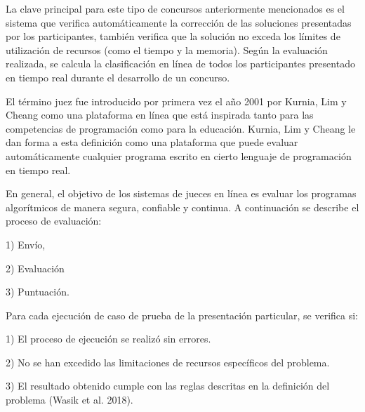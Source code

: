 La clave principal para este tipo de concursos anteriormente mencionados es el sistema que verifica automáticamente la corrección de las soluciones presentadas por los participantes, también verifica que la solución no exceda los límites de utilización de recursos (como el tiempo y la memoria). Según la evaluación realizada, se calcula la clasificación en línea de todos los participantes presentado en tiempo real durante el desarrollo de un concurso.

El término juez fue introducido por primera vez el año 2001 por Kurnia, Lim y Cheang como una plataforma en línea que está inspirada tanto para las competencias de programación como para la educación. Kurnia, Lim y Cheang le dan forma a esta definición como una plataforma que puede evaluar automáticamente cualquier programa escrito en cierto lenguaje de programación en tiempo real. \citep{KURNIA2001299}

En general, el objetivo de los sistemas de jueces en línea es evaluar los programas algorítmicos de manera segura, confiable y continua.
A continuación se describe el proceso de evaluación:

1) Envío,

2) Evaluación

3) Puntuación.

Para cada ejecución de caso de prueba de la presentación particular, se verifica si:

1) El proceso de ejecución se realizó sin errores.

2) No se han excedido las limitaciones de recursos específicos del problema.

3) El resultado obtenido cumple con las reglas descritas en la definición del problema (Wasik et al. 2018).

